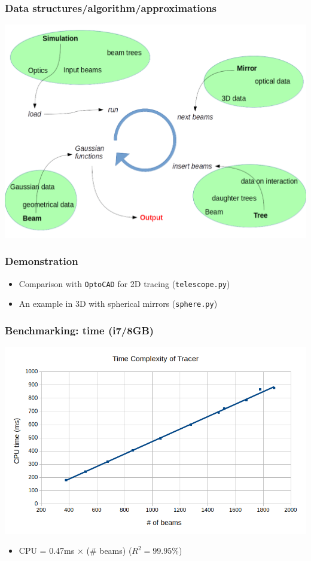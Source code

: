 \documentclass{beamer}
\begin{document}
\begin{frame}
\frametitle{Data structures/algorithm/approximations}
\begin{center}
\includegraphics[scale=0.35]{flow}
\end{center}

\end{frame}


\begin{frame}
\frametitle{Demonstration}
\begin{itemize}
\item Comparison with \texttt{OptoCAD} for 2D tracing (\texttt{telescope.py})
\item An example in 3D with spherical mirrors (\texttt{sphere.py})
\end{itemize}
\end{frame}


\begin{frame}
\frametitle{Benchmarking: time (i7/8GB)}

\begin{center}
\includegraphics[scale = .45]{timecomplexity.png}
\end{center}


\begin{itemize}
\item CPU = 0.47ms $\times$ (\# beams) ($R^2 = 99.95$\%)
\end{itemize}

\end{frame}
\end{document}
